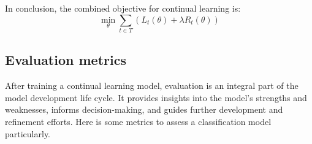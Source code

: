 \documentclass[12pt,a4paper]{article}
\begin{document}
In conclusion, the combined objective for continual learning is:
\begin{equation}
	\min_{\theta} \sum_{t \in T} \left( L_t(\theta) + \lambda R_t(\theta) \right)
\end{equation}

\subsection*{Evaluation metrics}

After training a continual learning model, evaluation is an integral part of the model development life cycle. It provides insights into the model's strengths and weaknesses, informs decision-making, and guides further development and refinement efforts. Here is some metrics to assess a classification model particularly.
\end{document}
